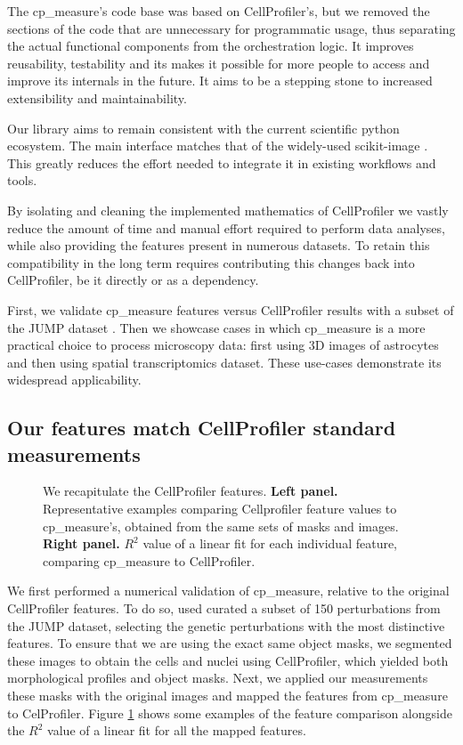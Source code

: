 \documentclass{article}
\begin{document}
The cp\_measure's code base was based on CellProfiler's, but we removed the sections of the code that are unnecessary for programmatic usage, thus separating the actual functional components from the orchestration logic. It improves reusability, testability and its makes it possible for more people to access and improve its internals in the future. It aims to be a stepping stone to increased extensibility and maintainability.

Our library aims to remain consistent with the current scientific python ecosystem. The main interface matches that of the widely-used scikit-image \citep{waltScikitimageImageProcessing2014}. This greatly reduces the effort needed to integrate it in existing workflows and tools.

By isolating and cleaning the implemented mathematics of CellProfiler we vastly reduce the amount of time and manual effort required to perform data analyses, while also providing the features present in numerous datasets. To retain this compatibility in the long term requires contributing this changes back into CellProfiler, be it directly or as a dependency.

First, we validate cp\_measure features versus CellProfiler results with a subset of the JUMP dataset \citep{chandrasekaranJUMPCellPainting2023}. Then we showcase cases in which cp\_measure is a more practical choice to process microscopy data: first using 3D images of astrocytes and then using spatial transcriptomics dataset. These use-cases demonstrate its widespread applicability. 
\subsection{Our features match CellProfiler standard measurements}
\label{sec:orge7bf29c}

\begin{figure}[htbp]
\centering

\caption{\label{fig:cp_vs_cpmeasure}We recapitulate the CellProfiler features. \textbf{Left panel.} Representative examples comparing Cellprofiler feature values to cp\_measure's, obtained from the same sets of masks and images. \textbf{Right panel.} \(R^2\) value of a linear fit for each individual feature, comparing cp\_measure to CellProfiler.}
\end{figure}

We first performed a numerical validation of cp\_measure, relative to the original CellProfiler features. To do so, used curated a subset of 150 perturbations from the JUMP dataset, selecting the genetic perturbations with the most distinctive features. To ensure that we are using the exact same object masks, we segmented these images to obtain the cells and nuclei using CellProfiler, which yielded both morphological profiles and object masks. Next, we applied our measurements these masks with the original images and mapped the features from cp\_measure to CelProfiler. Figure \ref{fig:cp_vs_cpmeasure} shows some examples of the feature comparison alongside the \(R^2\) value of a linear fit for all the mapped features.
\end{document}
